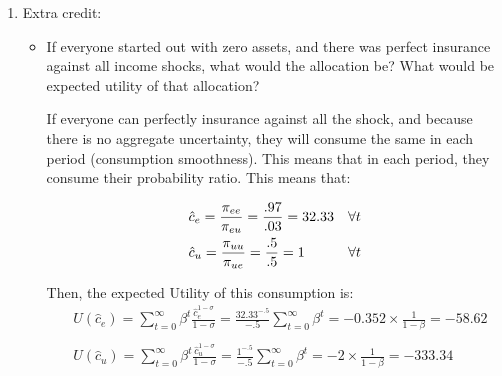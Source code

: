 \documentclass[12pt]{article}%
\begin{document}
\begin{enumerate}
	\item Extra credit:
	
	\begin{itemize}
		\item If everyone started out with zero assets, and there was perfect insurance against all income shocks, what would the allocation be? What would be expected utility of that allocation?
		
		If everyone can perfectly insurance against all the shock, and because there is no aggregate uncertainty, they will consume the same in each period (consumption smoothness). This means that in each period, they consume their probability ratio. This means that:
		
			\begin{align*}
		&\hat{c}_e=\frac{\pi_{ee}}{\pi_{eu}}=\frac{.97}{.03}=32.33  & \forall t \notag \\ 	
		&\hat{c}_u=\frac{\pi_{uu}}{\pi_{ue}}=\frac{.5}{.5}=1   & \forall t \notag \\ 			
		\end{align*}
		
		Then, the expected Utility of this consumption is: 
				\begin{align*}
		&U(\hat{c}_e)={\sum}_{t=0}^{\infty}\beta^{t}\frac{\hat{c}_e^{1-\sigma}}{1-\sigma}=\frac{32.33^{-.5}}{-.5}{\sum}_{t=0}^{\infty}\beta^{t}=-0.352\times\frac{1}{1-\beta}=-58.62\\
		\\
		&U(\hat{c}_u)={\sum}_{t=0}^{\infty}\beta^{t}\frac{\hat{c}_u^{1-\sigma}}{1-\sigma}=\frac{1^{-.5}}{-.5}{\sum}_{t=0}^{\infty}\beta^{t}=-2\times\frac{1}{1-\beta}=-333.34\\		 
		\end{align*}
	\end{itemize}
	
\end{enumerate}

\strut

\onehalfspacing
\end{document}
